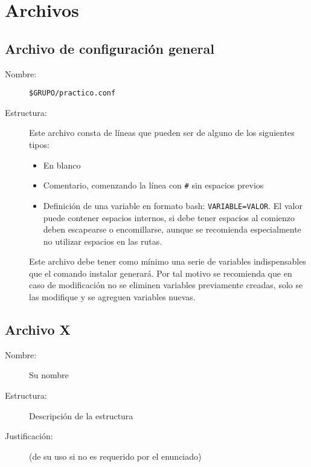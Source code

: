 \documentclass[12pt]{article}
\begin{document}
\section{Archivos}
\subsection{Archivo de configuración general}
\begin{description}
	\item [Nombre:] \verb|$GRUPO/practico.conf|
	\item [Estructura:] Este archivo consta de líneas que pueden ser de alguno de los siguientes tipos:
	\begin{itemize}
		\item En blanco
		\item Comentario, comenzando la línea con \verb|#| sin espacios previos
		\item Definición de una variable en formato bash: \verb|VARIABLE=VALOR|. El valor puede contener espacios internos, si debe tener espacios al comienzo deben escapearse o encomillarse, aunque se recomienda especialmente no utilizar espacios en las rutas.
	\end{itemize}
	Este archivo debe tener como mínimo una serie de variables indispensables que el comando instalar generará. Por tal motivo se recomienda que en caso de modificación no se eliminen variables previamente creadas, solo se las modifique y se agreguen variables nuevas.
\end{description}

\subsection{Archivo X}
\begin{description}
	\item [Nombre:] Su nombre
	\item [Estructura:] Descripción de la estructura
	\item [Justificación:] (de su uso si no es requerido por el enunciado)
\end{description}
\end{document}
